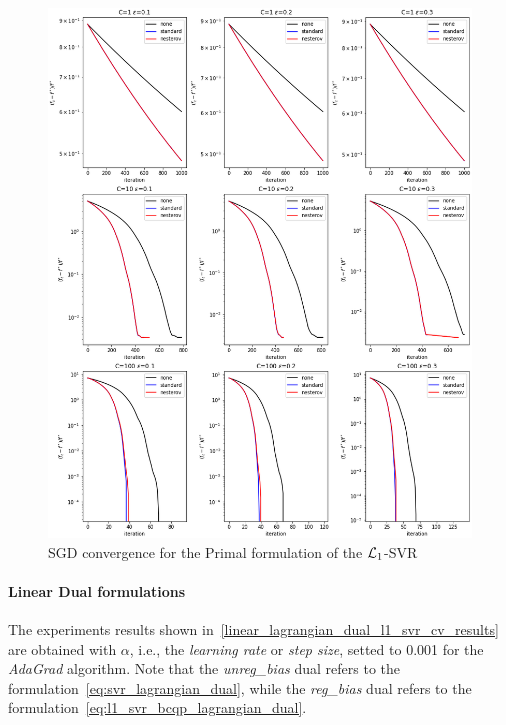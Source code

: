 \begin{figure}[H]
	\centering
	\includegraphics[scale=0.5]{img/l1_svr_loss_history}
	\caption{SGD convergence for the Primal formulation of the $\protect \mathcal{L}_1$-SVR}
	\label{fig:l1_svr_loss_history}
\end{figure}

\pagebreak

\paragraph{Linear Dual formulations}

The experiments results shown in~\ref{linear_lagrangian_dual_l1_svr_cv_results} are obtained with $\alpha$, i.e., the \emph{learning rate} or \emph{step size}, setted to 0.001 for the \emph{AdaGrad} algorithm. Note that the \emph{unreg\_bias} dual refers to the formulation~\eqref{eq:svr_lagrangian_dual}, while the \emph{reg\_bias} dual refers to the formulation~\eqref{eq:l1_svr_bcqp_lagrangian_dual}.



